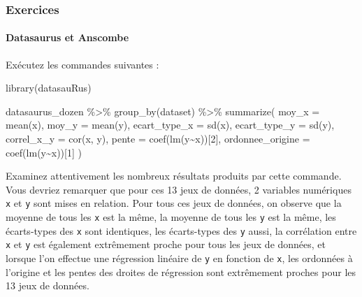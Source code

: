 \documentclass[
  a4paper,
]{article}
\newenvironment{Shaded}{\begin{snugshade}}{\end{snugshade}}
\newcommand{\AttributeTok}[1]{\textcolor[rgb]{0.00,0.34,0.68}{#1}}
\newcommand{\DecValTok}[1]{\textcolor[rgb]{0.69,0.50,0.00}{#1}}
\newcommand{\FunctionTok}[1]{\textcolor[rgb]{0.39,0.29,0.61}{#1}}
\newcommand{\NormalTok}[1]{\textcolor[rgb]{0.12,0.11,0.11}{#1}}
\newcommand{\SpecialCharTok}[1]{\textcolor[rgb]{0.24,0.68,0.91}{#1}}
\begin{document}
\hypertarget{exercices-1}{%
\subsubsection{Exercices}\label{exercices-1}}

\hypertarget{datasaurus-et-anscombe}{%
\paragraph{Datasaurus et Anscombe}\label{datasaurus-et-anscombe}}

Exécutez les commandes suivantes :

\begin{Shaded}
\begin{Highlighting}[]
\FunctionTok{library}\NormalTok{(datasauRus)}

\NormalTok{datasaurus\_dozen }\SpecialCharTok{\%\textgreater{}\%} 
    \FunctionTok{group\_by}\NormalTok{(dataset) }\SpecialCharTok{\%\textgreater{}\%} 
    \FunctionTok{summarize}\NormalTok{(}
      \AttributeTok{moy\_x    =} \FunctionTok{mean}\NormalTok{(x),}
      \AttributeTok{moy\_y    =} \FunctionTok{mean}\NormalTok{(y),}
      \AttributeTok{ecart\_type\_x =} \FunctionTok{sd}\NormalTok{(x),}
      \AttributeTok{ecart\_type\_y =} \FunctionTok{sd}\NormalTok{(y),}
      \AttributeTok{correl\_x\_y  =} \FunctionTok{cor}\NormalTok{(x, y),}
      \AttributeTok{pente =} \FunctionTok{coef}\NormalTok{(}\FunctionTok{lm}\NormalTok{(y}\SpecialCharTok{\textasciitilde{}}\NormalTok{x))[}\DecValTok{2}\NormalTok{],}
      \AttributeTok{ordonnee\_origine =} \FunctionTok{coef}\NormalTok{(}\FunctionTok{lm}\NormalTok{(y}\SpecialCharTok{\textasciitilde{}}\NormalTok{x))[}\DecValTok{1}\NormalTok{]}
\NormalTok{    )}
\end{Highlighting}
\end{Shaded}

Examinez attentivement les nombreux résultats produits par cette commande. Vous devriez remarquer que pour ces 13 jeux de données, 2 variables numériques \texttt{x} et \texttt{y} sont mises en relation. Pour tous ces jeux de données, on observe que la moyenne de tous les \texttt{x} est la même, la moyenne de tous les \texttt{y} est la même, les écarts-types des \texttt{x} sont identiques, les écarts-types des \texttt{y} aussi, la corrélation entre \texttt{x} et \texttt{y} est également extrêmement proche pour tous les jeux de données, et lorsque l'on effectue une régression linéaire de \texttt{y} en fonction de \texttt{x}, les ordonnées à l'origine et les pentes des droites de régression sont extrêmement proches pour les 13 jeux de données.
\end{document}
